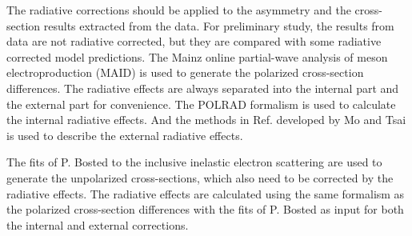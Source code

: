 The radiative corrections should be applied to the asymmetry and the cross-section results extracted from the data. For preliminary study, the results from data are not radiative corrected, but they are compared with some radiative corrected model predictions. The Mainz online partial-wave analysis of meson electroproduction (MAID) \cite{Drechsel2007} is used to generate the polarized cross-section differences. The radiative effects are always separated into the internal part and the external part for convenience. The POLRAD formalism \cite{Akushevich1997} is used to calculate the internal radiative effects. And the methods in Ref. \cite{Mo1969} developed by Mo and Tsai is used to describe the external radiative effects.

The fits of P. Bosted to the inclusive inelastic electron scattering \cite{Bosted2008} are used to generate the unpolarized cross-sections, which also need to be corrected by the radiative effects. The radiative effects are calculated using the same formalism as the polarized cross-section differences with the fits of P. Bosted as input for both the internal and external corrections.

